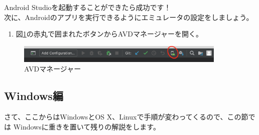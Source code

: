 \documentclass{jsarticle}
\begin{document}
                Android Studioを起動することができたら成功です！ \\

                次に、Androidのアプリを実行できるようにエミュレータの設定をしましょう。

                \begin{enumerate}
                    \item 図\ref{fig:AVD_manager}の赤丸で囲まれたボタンからAVDマネージャーを開く。
                \end{enumerate}

                \begin{figure}[ht]
                    \centering
                    \includegraphics[width=10cm]{images/AVD_manager.png}
                    \caption{AVDマネージャー}
                    \label{fig:AVD_manager}
                \end{figure}

        \subsection*{Windows編}
            さて、ここからはWindowsとOS X、Linuxで手順が変わってくるので、この節では
            Windowsに重きを置いて残りの解説をします。
                
            
\end{document}

